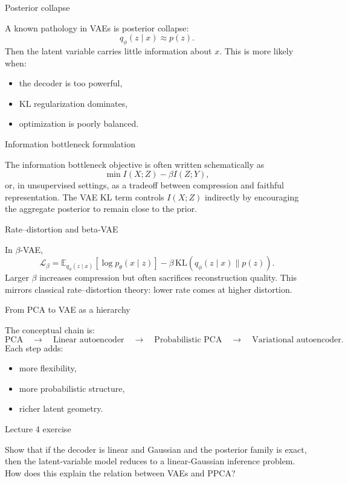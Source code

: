 \documentclass[aspectratio=169]{beamer}
\begin{document}
\begin{frame}{Posterior collapse}

A known pathology in VAEs is posterior collapse:
\[
q_\phi(z\mid x) \approx p(z).
\]
Then the latent variable carries little information about \(x\).
This is more likely when:
\begin{itemize}
\item the decoder is too powerful,
\item KL regularization dominates,
\item optimization is poorly balanced.
\end{itemize}

\end{frame}

\begin{frame}{Information bottleneck formulation}

The information bottleneck objective is often written schematically as
\[
\min I(X;Z) - \beta I(Z;Y),
\]
or, in unsupervised settings, as a tradeoff between compression and faithful representation.
The VAE KL term controls \(I(X;Z)\) indirectly by encouraging the aggregate posterior to remain close to the prior.

\end{frame}

\begin{frame}{Rate--distortion and beta-VAE}

In \(\beta\)-VAE,
\[
\mathcal{L}_\beta
=
\mathbb{E}_{q_\phi(z\mid x)}[\log p_\theta(x\mid z)]
-\beta \,\mathrm{KL}(q_\phi(z\mid x)\|p(z)).
\]
Larger \(\beta\) increases compression but often sacrifices reconstruction quality.
This mirrors classical rate--distortion theory: lower rate comes at higher distortion.

\end{frame}

\begin{frame}{From PCA to VAE as a hierarchy}

The conceptual chain is:
\[
\text{PCA}
\quad\to\quad
\text{Linear autoencoder}
\quad\to\quad
\text{Probabilistic PCA}
\quad\to\quad
\text{Variational autoencoder}.
\]
Each step adds:
\begin{itemize}
\item more flexibility,
\item more probabilistic structure,
\item richer latent geometry.
\end{itemize}

\end{frame}

\begin{frame}{Lecture 4 exercise}

Show that if the decoder is linear and Gaussian and the posterior family is exact, then the latent-variable model reduces to a linear-Gaussian inference problem.
How does this explain the relation between VAEs and PPCA?

\end{frame}
\end{document}
